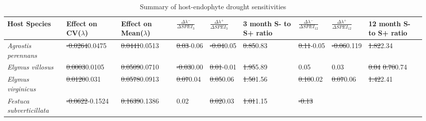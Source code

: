 \documentclass[lineno, sn-basic]{sn-jnl}%
\providecommand{\DIFadd}[1]{{\protect\color{blue}#1}} %
\providecommand{\DIFdel}[1]{{\protect\color{red}\protect\scriptsize\sout{#1}}}
\providecommand{\DIFadd}[1]{{\protect\color{blue}\uwave{#1}}} %
\providecommand{\DIFdel}[1]{{\protect\color{red}\sout{#1}}}                      %
\providecommand{\DIFaddbegin}{} %
\providecommand{\DIFaddend}{} %
\providecommand{\DIFdelbegin}{} %
\providecommand{\DIFdelend}{} %
\newcommand{\DIFscaledelfig}{0.5}
\newlength{\DIFdelgraphicswidth} %
\newlength{\DIFdelgraphicsheight} %
\newcommand{\DIFaddincludegraphics}[2][]{{\color{blue}\fbox{\DIFOincludegraphics[#1]{#2}}}} %
\newcommand{\DIFdelincludegraphics}[2][]{%
\sbox{\DIFdelgraphicsbox}{\DIFOincludegraphics[#1]{#2}}%
\settoboxwidth{\DIFdelgraphicswidth}{\DIFdelgraphicsbox} %
\settoboxtotalheight{\DIFdelgraphicsheight}{\DIFdelgraphicsbox} %
\scalebox{\DIFscaledelfig}{%
\parbox[b]{\DIFdelgraphicswidth}{\usebox{\DIFdelgraphicsbox}\\[-\baselineskip] \rule{\DIFdelgraphicswidth}{0em}}\llap{\resizebox{\DIFdelgraphicswidth}{\DIFdelgraphicsheight}{%
\setlength{\unitlength}{\DIFdelgraphicswidth}%
\begin{picture}(1,1)%
\thicklines\linethickness{2pt} %
{\color[rgb]{1,0,0}\put(0,0){\framebox(1,1){}}}%
{\color[rgb]{1,0,0}\put(0,0){\line( 1,1){1}}}%
{\color[rgb]{1,0,0}\put(0,1){\line(1,-1){1}}}%
\end{picture}%
}\hspace*{3pt}}} %
} %
\DeclareRobustCommand{\DIFaddbegin}{\DIFOaddbegin \let\includegraphics\DIFaddincludegraphics} %
\DeclareRobustCommand{\DIFaddend}{\DIFOaddend \let\includegraphics\DIFOincludegraphics} %
\DeclareRobustCommand{\DIFdelbegin}{\DIFOdelbegin \let\includegraphics\DIFdelincludegraphics} %
\DeclareRobustCommand{\DIFdelend}{\DIFOaddend \let\includegraphics\DIFOincludegraphics} %
\begin{document}
\begin{table}\centering
	\caption{Summary of host-endophyte drought sensitivities}
	\begin{tabular}{lp{1.4cm}p{1.4cm}p{1.5cm}p{1.5cm}p{1.5cm}p{1.5cm}p{1.5cm}p{1.5cm}}
		Host Species& \raggedright Effect on CV($\lambda$)&\raggedright Effect on Mean($\lambda$)&$\frac{\Delta\lambda^{-}}{\Delta SPEI_{3}}$ & $\frac{\Delta\lambda^{+}}{\Delta SPEI_{3}}$ &3 month S- to S+ ratio&$\frac{\Delta\lambda^{-}}{\Delta SPEI_{12}}$ &$\frac{\Delta\lambda^{+}}{\Delta SPEI_{12}}$ & 12 month S- to S+ ratio\\
		\midrule
		\emph{Agrostis perennans} &\DIFdelbegin \DIFdel{-0.0264}\DIFdelend \DIFaddbegin \DIFadd{0.0475}\DIFaddend &\DIFdelbegin \DIFdel{0.0441}\DIFdelend \DIFaddbegin \DIFadd{0.0513}\DIFaddend &\DIFdelbegin \DIFdel{0.03}\DIFdelend \DIFaddbegin \DIFadd{-0.06}\DIFaddend &\DIFdelbegin \DIFdel{-0.04}\DIFdelend \DIFaddbegin \DIFadd{0.05}\DIFaddend &\DIFdelbegin \DIFdel{0.85}\DIFdelend \DIFaddbegin \DIFadd{0.83}\DIFaddend &\DIFdelbegin \DIFdel{0.11}\DIFdelend \DIFaddbegin \DIFadd{-0.05}\DIFaddend &\DIFdelbegin \DIFdel{-0.06}\DIFdelend \DIFaddbegin \DIFadd{0.119}\DIFaddend &\DIFdelbegin \DIFdel{1.82}\DIFdelend \DIFaddbegin \DIFadd{2.34}\DIFaddend \\
		\emph{Elymus villosus} &\DIFdelbegin \DIFdel{0.0003}\DIFdelend \DIFaddbegin \DIFadd{0.0105}\DIFaddend &\DIFdelbegin \DIFdel{0.0509}\DIFdelend \DIFaddbegin \DIFadd{0.0710}\DIFaddend &\DIFdelbegin \DIFdel{-0.03}\DIFdelend \DIFaddbegin \DIFadd{0.00}\DIFaddend &\DIFdelbegin \DIFdel{0.01}\DIFdelend \DIFaddbegin \DIFadd{-0.01}\DIFaddend &\DIFdelbegin \DIFdel{1.95}\DIFdelend \DIFaddbegin \DIFadd{5.89}\DIFaddend &\DIFaddbegin \DIFadd{0.05}&\DIFaddend 0.03&\DIFdelbegin \DIFdel{0.04}%
\DIFdel{0.70}\DIFdelend \DIFaddbegin \DIFadd{0.74}\DIFaddend \\
		\emph{Elymus virginicus} &\DIFdelbegin \DIFdel{0.0120}\DIFdelend \DIFaddbegin \DIFadd{0.031}\DIFaddend &\DIFdelbegin \DIFdel{0.0578}\DIFdelend \DIFaddbegin \DIFadd{0.0913}\DIFaddend &\DIFdelbegin \DIFdel{0.07}\DIFdelend \DIFaddbegin \DIFadd{0.04}\DIFaddend &\DIFdelbegin \DIFdel{0.05}\DIFdelend \DIFaddbegin \DIFadd{0.06}\DIFaddend &\DIFdelbegin \DIFdel{1.50}\DIFdelend \DIFaddbegin \DIFadd{1.56}\DIFaddend &\DIFdelbegin \DIFdel{0.10}\DIFdelend \DIFaddbegin \DIFadd{0.02}\DIFaddend &\DIFdelbegin \DIFdel{0.07}\DIFdelend \DIFaddbegin \DIFadd{0.06}\DIFaddend &\DIFdelbegin \DIFdel{1.42}\DIFdelend \DIFaddbegin \DIFadd{2.41}\DIFaddend \\
		\emph{Festuca subverticillata} &\DIFdelbegin \DIFdel{-0.0622}\DIFdelend \DIFaddbegin \DIFadd{-0.1524}\DIFaddend &\DIFdelbegin \DIFdel{0.1639}\DIFdelend \DIFaddbegin \DIFadd{0.1386}\DIFaddend &0.02&\DIFdelbegin \DIFdel{0.02}\DIFdelend \DIFaddbegin \DIFadd{0.03}\DIFaddend &\DIFdelbegin \DIFdel{1.01}\DIFdelend \DIFaddbegin \DIFadd{1.15}\DIFaddend &\DIFdelbegin \DIFdel{-0.13}%

\end{tabular}
\end{table}
\end{document}
